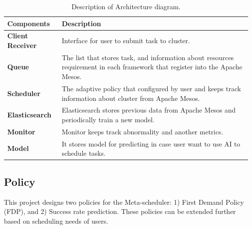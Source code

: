 \documentclass[12pt,oneside,openright,a4paper]{cpe-english-project}
\begin{document}
\begin{table}[!h]
  \caption{Description of Architecture diagram.}\label{tbl:ArchitectureDiagramTable}
  \begin{tabular}{@{}|p{}|p{}|}
    \hline
    \textbf{Components} & \textbf{Description}\\
    \hline
    \textbf{Client Receiver} & Interface for user to submit task to cluster.\\
    \hline
    \textbf{Queue} & The list that stores task, and information about resources requirement in each framework that register into the Apache Mesos.\\
    \hline
    \textbf{Scheduler} & The adaptive policy that configured by user and keeps track information about cluster from Apache Mesos.\\
    \hline
    \textbf{Elasticsearch} & Elasticsearch stores previous data from Apache Mesos and periodically train a new model.\\
    \hline
    \textbf{Monitor} & Monitor keeps track abnormality and another metrics.\\
    \hline
    \textbf{Model} & It stores model for predicting in case user want to use AI to schedule tasks.\\
    \hline
  \end{tabular}
\end{table}

\subsection{Policy}  
This project designs two policies for the Meta-scheduler: 1) First Demand Policy (FDP), and 2) Success rate prediction. These policies can be extended further based on scheduling needs of users. 
\end{document}
